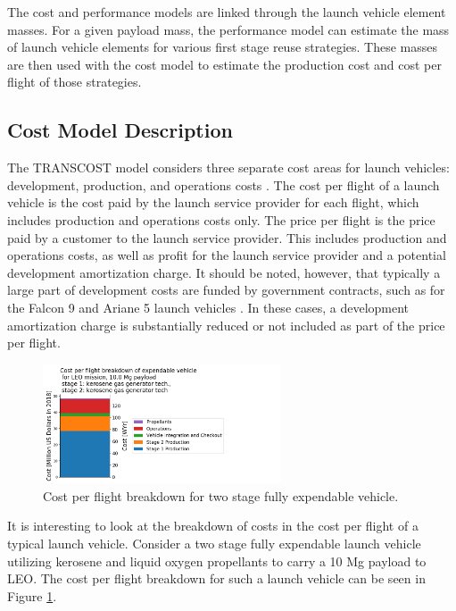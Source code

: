 \documentclass[conf]{new-aiaa}
\begin{document}
\begin{multicols}{2}
The cost and performance models are linked through the launch vehicle element masses. For a given payload mass, the performance model can estimate the mass of launch vehicle elements for various first stage reuse strategies. These masses are then used with the cost model to estimate the production cost and cost per flight of those strategies. 

\subsection{Cost Model Description}

The TRANSCOST model considers three separate cost areas for launch vehicles: development, production, and operations costs \cite{transcost}. The cost per flight of a launch vehicle is the cost paid by the launch service provider for each flight, which includes production and operations costs only. The price per flight is the price paid by a customer to the launch service provider. This includes production and operations costs, as well as profit for the launch service provider and a potential development amortization charge. It should be noted, however, that typically a large part of development costs are funded by government contracts, such as for the Falcon 9 and Ariane 5 launch vehicles \cite{NASAspaceX, ESAAriane5}. In these cases, a development amortization charge is substantially reduced or not included as part of the price per flight.

\begin{figure}[H]
    \centering
    \includegraphics[width=0.63\textwidth]{../../lvreuse/analysis/combined/plots/expendable_cost_breakdown}
    \caption{\label{fig:expendable_cost_breakdown} Cost per flight breakdown for two stage fully expendable vehicle.}
\end{figure}

It is interesting to look at the breakdown of costs in the cost per flight of a typical launch vehicle. Consider a two stage fully expendable launch vehicle utilizing kerosene and liquid oxygen propellants to carry a 10 Mg payload to LEO. The cost per flight breakdown for such a launch vehicle can be seen in Figure \ref{fig:expendable_cost_breakdown}. 


\end{multicols}
\end{document}
